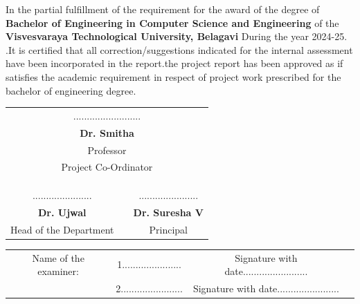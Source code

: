 \documentclass{report}
\begin{document}
	In the partial fulfillment of the requirement for the award of the degree of \textbf{Bachelor of Engineering in Computer Science and Engineering} of the \textbf{Visvesvaraya Technological University, Belagavi} During the year 2024-25. .It is certified that all correction/suggestions indicated for the internal assessment have been incorporated in the
	report.the project report has been approved as if satisfies the academic requirement
	in respect of project work prescribed for the bachelor of engineering degree.
	\vfill
\begin{table}[h!]
	\begin{center}
		\begin{tabular}{ccc}

			\multicolumn{3}{c}{.........................} \\ %
			\multicolumn{3}{c}{\textbf{Dr. Smitha}} \\ %
			\multicolumn{3}{c}{Professor} \\ %
			\multicolumn{3}{c}{Project Co-Ordinator} \\ %
			{} & {} & {} \\
				\\
				\\
				......................&&......................\\
				\textbf{Dr. Ujwal }&&\textbf{Dr. Suresha V}\\
				Head of the Department && Principal\\
			\end{tabular}
		\end{center}
	\end{table}
	\begin{table}[h!]
		\begin{tabular}{cccc}
			Name of the examiner:&1......................&Signature with date........................\\
			&2.......................&Signature with date.......................\\
		\end{tabular}
	\end{table}
\end{document}
